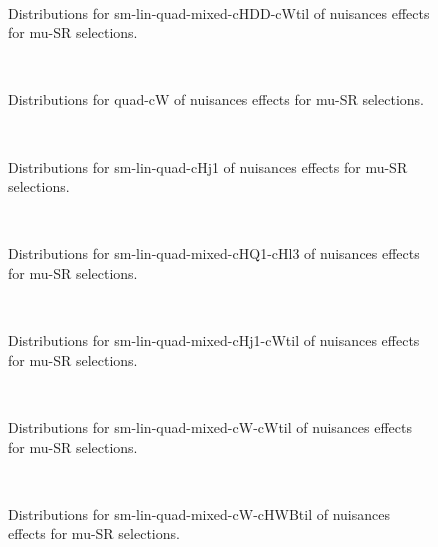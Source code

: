 \begin{figure}[htbp]  
\centering 
\\ 
\caption{ 
   Distributions for sm-lin-quad-mixed-cHDD-cWtil of nuisances effects for mu-SR selections.
} 
\label{fig:sm_lin_quad_mixed_cHDD_cWtil_mu_SR} 
\end{figure} 




\begin{figure}[htbp]  
\centering 
\\ 
\caption{ 
   Distributions for quad-cW of nuisances effects for mu-SR selections.
} 
\label{fig:quad_cW_mu_SR} 
\end{figure} 




\begin{figure}[htbp]  
\centering 
\\ 
\caption{ 
   Distributions for sm-lin-quad-cHj1 of nuisances effects for mu-SR selections.
} 
\label{fig:sm_lin_quad_cHj1_mu_SR} 
\end{figure} 




\begin{figure}[htbp]  
\centering 
\\ 
\caption{ 
   Distributions for sm-lin-quad-mixed-cHQ1-cHl3 of nuisances effects for mu-SR selections.
} 
\label{fig:sm_lin_quad_mixed_cHQ1_cHl3_mu_SR} 
\end{figure} 




\begin{figure}[htbp]  
\centering 
\\ 
\caption{ 
   Distributions for sm-lin-quad-mixed-cHj1-cWtil of nuisances effects for mu-SR selections.
} 
\label{fig:sm_lin_quad_mixed_cHj1_cWtil_mu_SR} 
\end{figure} 




\begin{figure}[htbp]  
\centering 
\\ 
\caption{ 
   Distributions for sm-lin-quad-mixed-cW-cWtil of nuisances effects for mu-SR selections.
} 
\label{fig:sm_lin_quad_mixed_cW_cWtil_mu_SR} 
\end{figure} 




\begin{figure}[htbp]  
\centering 
\\ 
\caption{ 
   Distributions for sm-lin-quad-mixed-cW-cHWBtil of nuisances effects for mu-SR selections.
} 
\label{fig:sm_lin_quad_mixed_cW_cHWBtil_mu_SR} 
\end{figure} 




